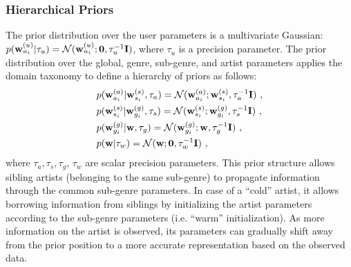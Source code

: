 \subsubsection{Hierarchical Priors}
The prior distribution over the user parameters is a multivariate Gaussian:
$p(\mathbf{w}^{(u)}_{u_i} | \tau_u) = \mathcal{N}(\mathbf{w}^{(u)}_{u_i} ; \mathbf{0}, \tau_u^{-1}\mathbf{I} )$, where $\tau_u$ is a precision parameter.
The prior distribution over the global, genre, sub-genre, and artist parameters applies the domain taxonomy to define a hierarchy of priors as follows:
\begin{align}
&p(\mathbf{w}^{(a)}_{a_i} | \mathbf{w}^{(s)}_{s_i}, \tau_a )  = \mathcal{N} (\mathbf{w}^{(a)}_{a_i}; \mathbf{w}^{(s)}_{s_i}, \tau_a^{-1}\mathbf{I} ) \ , \nonumber \\
&p(\mathbf{w}^{(s)}_{s_i} | \mathbf{w}^{(g)}_{g_i}, \tau_s)   = \mathcal{N} (\mathbf{w}^{(s)}_{s_i}; \mathbf{w}^{(g)}_{g_i}, \tau_s^{-1}\mathbf{I} ) \ , \nonumber \\
&p(\mathbf{w}^{(g)}_{g_i} | \mathbf{w}, \tau_g )              = \mathcal{N} (\mathbf{w}^{(g)}_{g_i}; \mathbf{w}, \tau_g^{-1}\mathbf{I} )             \ , \nonumber \\
&p(\mathbf{w} | \tau_w)                               = \mathcal{N} (\mathbf{w}; \mathbf{0}, \tau_w^{-1}\mathbf{I} ) \ ,
\end{align}
where $\tau_a, \tau_s, \tau_g$, $\tau_w$ are scalar precision parameters.
This prior structure allows sibling artists (belonging to the same sub-genre) to propagate information through the common sub-genre parameters. 
In case of a ``cold'' artist, it allows borrowing information from siblings by initializing the artist parameters according to the sub-genre parameters (i.e. ``warm'' initialization). As more information on the artist is observed, its parameters can gradually shift away from the prior position to a more accurate representation based on the observed data.
